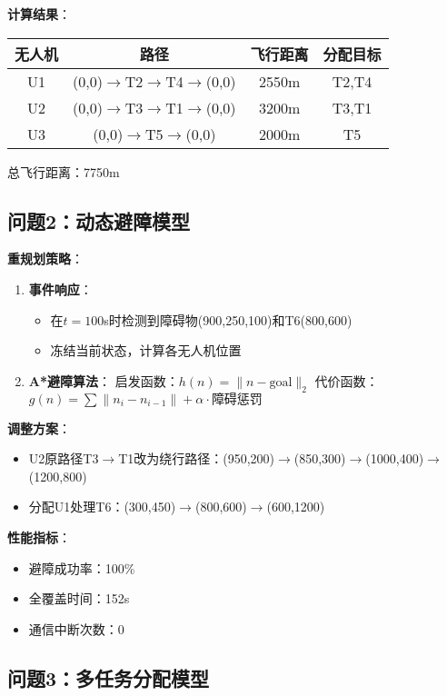 \documentclass[12pt,fontset=adobe]{ctexart}
\begin{document}
\textbf{计算结果}：
\begin{tabular}{|c|c|c|c|}
\hline
无人机 & 路径 & 飞行距离 & 分配目标 \\
\hline
U1 & (0,0)$\to$T2$\to$T4$\to$(0,0) & 2550m & T2,T4 \\
U2 & (0,0)$\to$T3$\to$T1$\to$(0,0) & 3200m & T3,T1 \\
U3 & (0,0)$\to$T5$\to$(0,0) & 2000m & T5 \\
\hline
\end{tabular}

总飞行距离：7750m

\subsection{问题2：动态避障模型}

\textbf{重规划策略}：
\begin{enumerate}
    \item \textbf{事件响应}：
    \begin{itemize}
        \item 在$t=100$s时检测到障碍物(900,250,100)和T6(800,600)
        \item 冻结当前状态，计算各无人机位置
    \end{itemize}
    \item \textbf{A*避障算法}：
    启发函数：$h(n) = \|n-\text{goal}\|_2$
    代价函数：$g(n) = \sum \|n_i-n_{i-1}\| + \alpha \cdot \text{障碍惩罚}$
\end{enumerate}

\textbf{调整方案}：
\begin{itemize}
    \item U2原路径T3$\to$T1改为绕行路径：(950,200)$\to$(850,300)$\to$(1000,400)$\to$(1200,800)
    \item 分配U1处理T6：(300,450)$\to$(800,600)$\to$(600,1200)
\end{itemize}

\textbf{性能指标}：
\begin{itemize}
    \item 避障成功率：100\%
    \item 全覆盖时间：152s
    \item 通信中断次数：0
\end{itemize}

\subsection{问题3：多任务分配模型}
\end{document}

